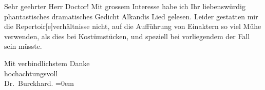 \pstart\center{}Sehr geehrter Herr Doctor!\pend\vspace{0.5em}
\pstart
           Mit grossem Interesse habe ich Ihr liebenswürdig phantastisches dramatisches Gedicht
                  Alkandis Lied gelesen. Leider gestatten mir
               die Repertoir{[}e{]}verhältnisse nicht, auf die Aufführung von
               Einaktern so viel Mühe \label{T_L00024-1v}\label{T_L00024-1}
               verwenden, als dies bei Kostümstücken, und speziell bei vorliegendem der Fall sein
               müsste.\pend
           
\pstart
           Mit verbindlichstem Danke{\\[\baselineskip]}hochachtungsvoll{\\[\baselineskip]}\spacefill\mbox{Dr. Burckhard.}\pend
           \leftskip=0em{}\endnumbering{}  \newcommand{\dateiname}{L00024}\newcommand{\titel}{Max Burckhard an Arthur Schnitzler, 14. 7. 1891}\newcommand{\editorInnen}{Martin Anton Müller und Gerd-Hermann Susen}

